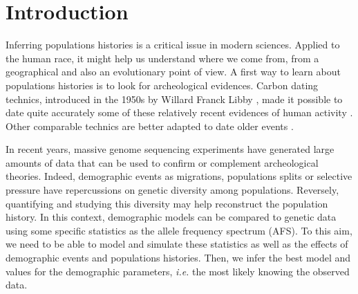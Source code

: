 \section{Introduction}
Inferring populations histories is a critical issue in modern sciences. Applied to the human race, it might help us understand where we come from, from a geographical and also an evolutionary point of view.
A first way to learn about populations histories is to look for archeological evidences. Carbon dating technics, introduced in the 1950s by Willard Franck Libby \cite{libby1949}, made it possible to date quite accurately some of these relatively recent evidences of human activity \cite{valladas2001}. Other comparable technics are better adapted to date older events \cite{walter1994}.

In recent years, massive genome sequencing experiments have generated large amounts of data that can be used to confirm or complement archeological theories. Indeed, demographic events as migrations, populations splits or selective pressure have repercussions on genetic diversity among populations. Reversely, quantifying and studying this diversity may help reconstruct the population history. In this context, demographic models can be compared to genetic data using some specific statistics as the allele frequency spectrum (AFS). To this aim, we need to be able to model and simulate these statistics as well as the effects of demographic events and populations histories. Then, we infer the best model and values for the demographic parameters, \textit{i.e.} the most likely knowing the observed data.

